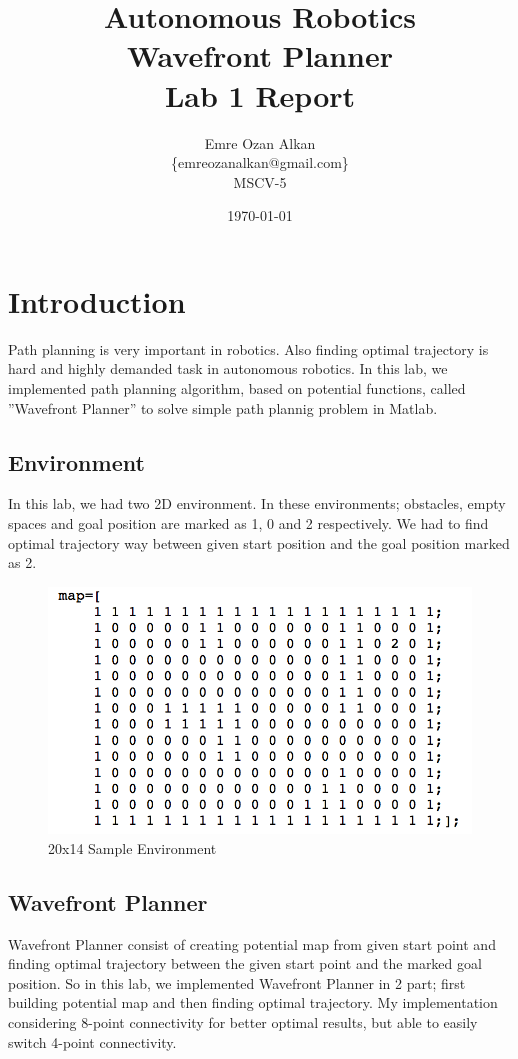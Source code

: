 \documentclass{article}
\title{Autonomous Robotics\\
		Wavefront Planner\\
		Lab 1 Report}
\author{Emre Ozan Alkan\\
		\{emreozanalkan@gmail.com\}\\
		MSCV-5}
\date{\today}
\begin{document}
\maketitle

\section{Introduction}

	Path planning is very important in robotics. Also finding optimal trajectory is hard and highly demanded task in autonomous robotics. In this lab, we implemented path planning algorithm, based on potential functions, called ''Wavefront Planner'' to solve simple path plannig problem in Matlab.

	\subsection{Environment}
	
	In this lab, we had two 2D environment. In these environments; obstacles, empty spaces and goal position are marked as 1, 0 and 2 respectively. We had to find optimal trajectory way between given start position and the goal position marked as 2.

\begin{figure}[ht!]
\begin{center}
\includegraphics[scale=0.4]{mapMatrix.png}
\caption{20x14 Sample Environment}
\end{center}
\end{figure}
	
	\subsection{Wavefront Planner}
	Wavefront Planner consist of creating potential map from given start point and finding optimal trajectory between the given start point and the marked goal position. So in this lab, we implemented Wavefront Planner in 2 part; first building potential map and then finding optimal trajectory. My implementation considering 8-point connectivity for better optimal results, but able to easily switch 4-point connectivity.
	
\end{document}
